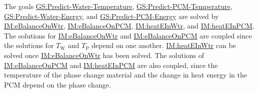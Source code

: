 \documentclass[12pt]{article}
\begin{document}
The goals \hyperref[waterTempGS]{GS:Predict-Water-Temperature}, \hyperref[pcmTempGS]{GS:Predict-PCM-Temperature}, \hyperref[waterEnergyGS]{GS:Predict-Water-Energy}, and \hyperref[pcmEnergyGS]{GS:Predict-PCM-Energy} are solved by \hyperref[IM:eBalanceOnWtr]{IM:eBalanceOnWtr}, \hyperref[IM:eBalanceOnPCM]{IM:eBalanceOnPCM}, \hyperref[IM:heatEInWtr]{IM:heatEInWtr}, and \hyperref[IM:heatEInPCM]{IM:heatEInPCM}. The solutions for \hyperref[IM:eBalanceOnWtr]{IM:eBalanceOnWtr} and \hyperref[IM:eBalanceOnPCM]{IM:eBalanceOnPCM} are coupled since the solutions for ${T_{\text{W}}}$ and ${T_{\text{P}}}$ depend on one another. \hyperref[IM:heatEInWtr]{IM:heatEInWtr} can be solved once \hyperref[IM:eBalanceOnWtr]{IM:eBalanceOnWtr} has been solved. The solutions of \hyperref[IM:eBalanceOnPCM]{IM:eBalanceOnPCM} and \hyperref[IM:heatEInPCM]{IM:heatEInPCM} are also coupled, since the temperature of the phase change material and the change in heat energy in the PCM depend on the phase change.
\end{document}
